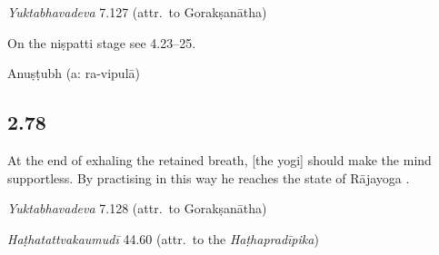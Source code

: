 \begin{ekdosis}
\begin{testimonia}[hp02_077]
\emph{Yuktabhavadeva} 7.127 (attr.~to Gorakṣanātha)

\begin{versinnote}
\end{versinnote}

\end{testimonia}

\begin{philcomm}[hp02_077]
On the niṣpatti stage see 4.23–25.
\end{philcomm}

\begin{metre}[hp02_077]
Anuṣṭubh (a: ra-vipulā)
\end{metre}

\subsection*{2.78}
\begin{translation}[hp02_078]
At the end of exhaling the retained breath, [the yogi] should make the mind supportless. By practising in this way he reaches the state of Rājayoga .
\end{translation}

\begin{testimonia}[hp02_078]
\emph{Yuktabhavadeva} 7.128 (attr.~to Gorakṣanātha)

\begin{versinnote}
\end{versinnote}

\emph{Haṭhatattvakaumudī} 44.60 (attr.~to the \emph{Haṭhapradīpika})

\begin{versinnote}
\end{versinnote}


\end{testimonia}
\end{ekdosis}
